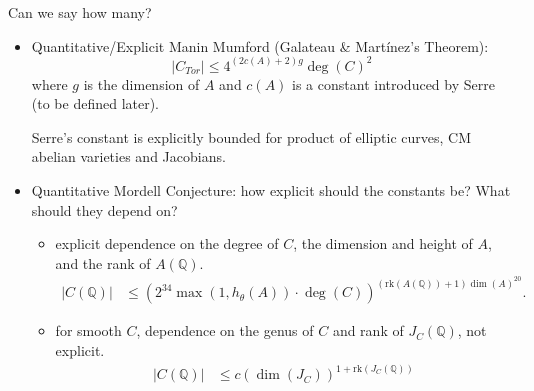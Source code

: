 \documentclass[12pt]{beamer}
\begin{document}
\begin{frame}{Can we say how many?}
\vspace{-0.3cm}
\begin{tcolorbox}\begin{itemize} \item Quantitative/Explicit  Manin Mumford (Galateau \& Martínez's Theorem): 
$$ \lvert C_{Tor} \rvert \le 4^{(2c(A)+2)g} \deg(C)^2$$ where $g$ is the dimension of $A$ and $c(A)$ is a constant introduced by Serre (to be defined later).
 
 Serre's constant is  explicitly bounded for product of elliptic curves, CM abelian varieties and Jacobians.

\vspace{0.2cm}
\pause

 \item Quantitative Mordell Conjecture: how explicit should the constants be? What should they depend on?  
	\begin{itemize}
		\item explicit dependence on the degree of $C$, the dimension and height of $A$, and the rank of $A(\mathbb{Q})$.
		\begin{align}
			\lvert C(\mathbb{Q}) \rvert &\leq (2^{34} \max(1,h_\theta(A)) \cdot \deg(C))^{(\mathrm{rk}(A(\mathbb{Q}))+1) \dim(A)^{20}}. \tag{Rémond + David-Philippon}
		\end{align}
		\item for smooth $C$, dependence on the genus of $C$ and rank of $J_C(\mathbb{Q})$, not explicit.
		\begin{align}
			\lvert C(\mathbb{Q}) \rvert &\leq c(\dim(J_C))^{1 + \mathrm{rk}(J_C(\mathbb{Q}))} \tag{Dimitrov, Gao, Habegger}
		\end{align}
	\end{itemize}
\end{itemize}
\end{tcolorbox}


\end{frame}
\end{document}
